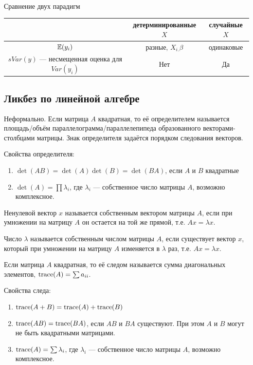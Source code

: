 \documentclass[12pt, a4paper]{article}
\begin{document}
Сравнение двух парадигм

\begin{tabular}{c|cc}
\toprule
 & детерминированные $X$  & случайные $X$ \\
\midrule
$\mathbb{E}(y_i)$ & разные, $X_{i.}\beta$ & одинаковые \\
$sVar(y)$ — несмещенная оценка для $Var(y_i)$ & Нет & Да \\
\bottomrule
\end{tabular}



\subsection{Ликбез по линейной алгебре}

\begin{definition}
Неформально. Если матрица $A$ квадратная, то её определителем называется площадь/объём параллелограмма/параллелепипеда образованного векторами-столбцами матрицы. Знак определителя задаётся порядком следования векторов.
\end{definition}


Свойства определителя:
\begin{enumerate}
\item $\det(AB)=\det(A)\det(B)=\det(BA)$, если $A$ и $B$ квадратные
\item $\det(A)=\prod \lambda_i$, где $\lambda_i$ — собственное число матрицы $A$, возможно комплексное.
\end{enumerate}


\begin{definition}
Ненулевой вектор $x$ называется собственным вектором матрицы $A$, если при умножении на матрицу $A$ он остается на той же прямой, т.е. $Ax=\lambda x$.
\end{definition}

\begin{definition}
Число $\lambda$ называется собственным числом матрицы $A$, если существует вектор $x$, который при умножении на матрицу $A$ изменяется в $\lambda$ раз, т.е. $Ax=\lambda x$.
\end{definition}

\begin{definition}
Если матрица $A$ квадратная, то её следом называется сумма диагональных элементов, $\operatorname{trace}(A)=\sum a_{ii}$.
\end{definition}

Свойства следа:
\begin{enumerate}
\item $\operatorname{trace}(A+B)=\operatorname{trace}(A)+\operatorname{trace}(B)$
\item $\operatorname{trace}(AB)=\operatorname{trace}(BA)$, если $AB$ и $BA$ существуют. При этом $A$ и $B$ могут не быть квадратными матрицами.
\item $\operatorname{trace}(A)=\sum \lambda_i$, где $\lambda_i$ — собственное число матрицы $A$, возможно комплексное.
\end{enumerate}
\end{document}
